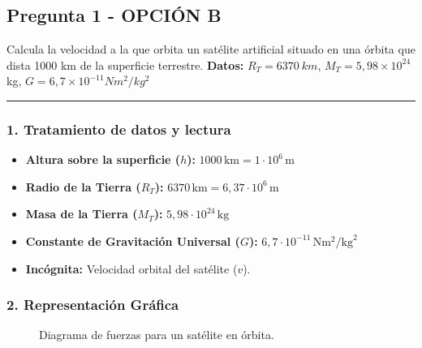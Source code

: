 \newpage

\subsection{Pregunta 1 - OPCIÓN B}
\label{subsec:1B_2006_sep}

\begin{cajaenunciado}
Calcula la velocidad a la que orbita un satélite artificial situado en una órbita que dista 1000 km de la superficie terrestre. 
\textbf{Datos:} $R_{T}=6370~km$, $M_{T}=5,98\times10^{24}$ kg, $G=6,7\times10^{-11}Nm^{2}/kg^{2}$ 
\end{cajaenunciado}
\hrule

\subsubsection*{1. Tratamiento de datos y lectura}
\begin{itemize}
    \item \textbf{Altura sobre la superficie ($h$):} $1000 \, \text{km} = 1 \cdot 10^6 \, \text{m}$
    \item \textbf{Radio de la Tierra ($R_T$):} $6370 \, \text{km} = 6,37 \cdot 10^6 \, \text{m}$
    \item \textbf{Masa de la Tierra ($M_T$):} $5,98 \cdot 10^{24} \, \text{kg}$
    \item \textbf{Constante de Gravitación Universal ($G$):} $6,7 \cdot 10^{-11} \, \text{N}\text{m}^2/\text{kg}^2$
    \item \textbf{Incógnita:} Velocidad orbital del satélite ($v$).
\end{itemize}

\subsubsection*{2. Representación Gráfica}
\begin{figure}[H]
    \centering
    \caption{Diagrama de fuerzas para un satélite en órbita.}
\end{figure}

